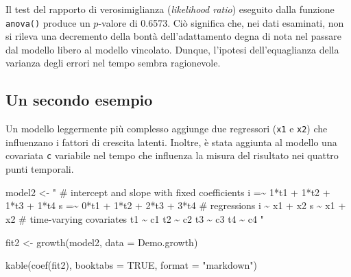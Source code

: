 \documentclass[
  11pt,
]{krantz}
\makeatletter
\newenvironment{Shaded}{\begin{snugshade}}{\end{snugshade}}
\newcommand{\AttributeTok}[1]{\textcolor[rgb]{0.61,0.61,0.61}{#1}}
\newcommand{\ConstantTok}[1]{\textcolor[rgb]{0,0,0}{#1}}
\newcommand{\FunctionTok}[1]{\textcolor[rgb]{0,0,0}{#1}}
\newcommand{\NormalTok}[1]{#1}
\newcommand{\OtherTok}[1]{\textcolor[rgb]{0.37,0.37,0.37}{#1}}
\newcommand{\StringTok}[1]{\textcolor[rgb]{0.5,0.5,0.5}{#1}}
\newenvironment{kframe}{%
\medskip{}
\setlength{\fboxsep}{.8em}
 \def\at@end@of@kframe{}%
 \ifinner\ifhmode%
  \def\at@end@of@kframe{\end{minipage}}%
  \begin{minipage}{\columnwidth}%
 \fi\fi%
 \def\FrameCommand##1{\hskip\@totalleftmargin \hskip-\fboxsep
 \colorbox{shadecolor}{##1}\hskip-\fboxsep
     \hskip-\linewidth \hskip-\@totalleftmargin \hskip\columnwidth}%
 \MakeFramed {\advance\hsize-\width
   \@totalleftmargin\z@ \linewidth\hsize
   \@setminipage}}%
 {\par\unskip\endMakeFramed%
 \at@end@of@kframe}
\renewenvironment{Shaded}{\begin{kframe}}{\end{kframe}}
\theoremstyle{definition}
\theoremstyle{definition}
\theoremstyle{definition}
\theoremstyle{definition}
\theoremstyle{remark}
\makeatother
\begin{document}
Il test del rapporto di verosimiglianza (\emph{likelihood ratio}) eseguito dalla funzione \texttt{anova()} produce un \(p\)-valore di 0.6573. Ciò significa che, nei dati esaminati, non si rileva una decremento della bontà dell'adattamento degna di nota nel passare dal modello libero al modello vincolato. Dunque, l'ipotesi dell'equaglianza della varianza degli errori nel tempo sembra ragionevole.

\hypertarget{un-secondo-esempio}{%
\subsection{Un secondo esempio}\label{un-secondo-esempio}}

Un modello leggermente più complesso aggiunge due regressori (\texttt{x1} e \texttt{x2}) che influenzano i fattori di crescita latenti. Inoltre, è stata aggiunta al modello una covariata \texttt{c} variabile nel tempo che influenza la misura del risultato nei quattro punti temporali.

\begin{Shaded}
\begin{Highlighting}[]
\NormalTok{model2 }\OtherTok{\textless{}{-}} \StringTok{"}
\StringTok{  \# intercept and slope with fixed coefficients}
\StringTok{    i =\textasciitilde{} 1*t1 + 1*t2 + 1*t3 + 1*t4}
\StringTok{    s =\textasciitilde{} 0*t1 + 1*t2 + 2*t3 + 3*t4}
\StringTok{  \# regressions}
\StringTok{    i \textasciitilde{} x1 + x2}
\StringTok{    s \textasciitilde{} x1 + x2}
\StringTok{  \# time{-}varying covariates}
\StringTok{    t1 \textasciitilde{} c1}
\StringTok{    t2 \textasciitilde{} c2}
\StringTok{    t3 \textasciitilde{} c3}
\StringTok{    t4 \textasciitilde{} c4}
\StringTok{"}
\end{Highlighting}
\end{Shaded}

\begin{Shaded}
\begin{Highlighting}[]
\NormalTok{fit2 }\OtherTok{\textless{}{-}} \FunctionTok{growth}\NormalTok{(model2, }\AttributeTok{data =}\NormalTok{ Demo.growth)}
\end{Highlighting}
\end{Shaded}

\begin{Shaded}
\begin{Highlighting}[]
\FunctionTok{kable}\NormalTok{(}\FunctionTok{coef}\NormalTok{(fit2), }\AttributeTok{booktabs =} \ConstantTok{TRUE}\NormalTok{, }\AttributeTok{format =} \StringTok{"markdown"}\NormalTok{)}
\end{Highlighting}
\end{Shaded}
\end{document}
